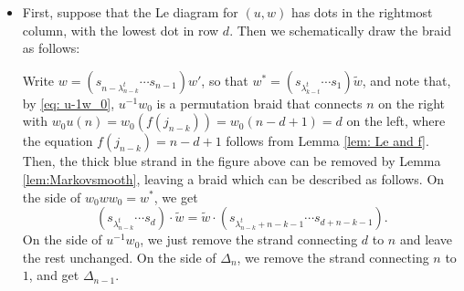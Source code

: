 \documentclass[10pt]{amsart}
\theoremstyle{plain}
\theoremstyle{definition}
\theoremstyle{remark}
\numberwithin{equation}{section}
\begin{document}
\begin{itemize}
    \item[(1)] First, suppose that the Le diagram for $(u,w)$ has dots in the rightmost column, with the lowest dot in row $d$. Then we schematically draw the braid %
    as follows:
\begin{center}
\end{center}

Write $w = (s_{n-\lambda_{n-k}^{t}}\cdots s_{n-1})w'$, so that $w^* = (s_{\lambda_{k-t}^{t}}\cdots s_{1})\widetilde{w}$, and note that, by \eqref{eq: u-1w_0}, $u^{-1}w_0$ is a permutation braid that connects $n$ on the right with $w_0u(n)= w_0(f(j_{n-k})) = w_0(n-d+1) = d$ on the left, where the equation $f(j_{n-k}) = n-d+1$ follows from Lemma \ref{lem: Le and f}. Then, the thick blue strand in the figure above can be removed by Lemma \ref{lem:Markovsmooth}, leaving a braid which can be described as follows. On the side of $w_0ww_0=w^*$, we get
$$
\left(s_{\lambda_{n-k}^{t}}\cdots s_{d}\right)\cdot\widetilde{w}= \widetilde{w}\cdot\left(s_{\lambda_{n-k}^{t}+n-k-1}\cdots s_{d+n-k-1} \right).
$$
On the side of $u^{-1}w_0$, we just remove the strand connecting $d$ to $n$ and leave the rest unchanged. On the side of $\Delta_n$, we remove the strand connecting $n$ to $1$, and get $\Delta_{n-1}$.\\


\end{itemize}
\end{document}
